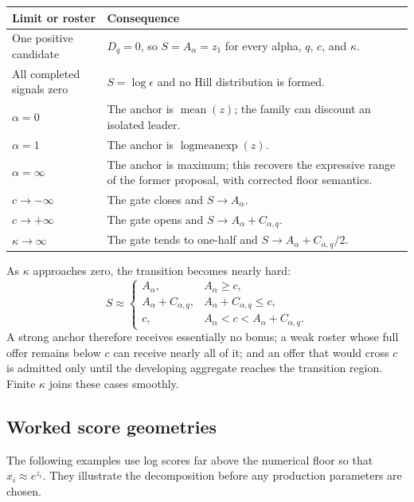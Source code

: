 \documentclass[11pt]{article}
\begin{document}
\begin{center}
\small
\begin{tabularx}{0.96\textwidth}{@{}p{}>{\raggedright\arraybackslash}X@{}}
\toprule
Limit or roster & Consequence \\
\midrule
One positive candidate & $D_q=0$, so $S=A_\alpha=z_1$ for every alpha,
$q$, $c$, and $\kappa$. \\
All completed signals zero & $S=\log\epsilon$ and no Hill distribution is
formed. \\
$\alpha=0$ & The anchor is $\operatorname{mean}(z)$; the family can discount
an isolated leader. \\
$\alpha=1$ & The anchor is $\operatorname{logmeanexp}(z)$. \\
$\alpha=\infty$ & The anchor is maximum; this recovers the expressive range
of the former proposal, with corrected floor semantics. \\
$c\rightarrow-\infty$ & The gate closes and $S\rightarrow A_\alpha$. \\
$c\rightarrow+\infty$ & The gate opens and
$S\rightarrow A_\alpha+C_{\alpha,q}$. \\
$\kappa\rightarrow\infty$ & The gate tends to one-half and
$S\rightarrow A_\alpha+C_{\alpha,q}/2$. \\
\bottomrule
\end{tabularx}
\end{center}

As $\kappa$ approaches zero, the transition becomes nearly hard:
\begin{equation}
S
\approx
\begin{cases}
A_\alpha, & A_\alpha\geq c,\\
A_\alpha+C_{\alpha,q}, & A_\alpha+C_{\alpha,q}\leq c,\\
c, & A_\alpha<c<A_\alpha+C_{\alpha,q}.
\end{cases}
\label{eq:hard-gate}
\end{equation}
A strong anchor therefore receives essentially no bonus; a weak roster whose
full offer remains below $c$ can receive nearly all of it; and an offer that
would cross $c$ is admitted only until the developing aggregate reaches the
transition region. Finite $\kappa$ joins these cases smoothly.

\subsection{Worked score geometries}

The following examples use log scores far above the numerical floor so that
$x_i\approx e^{z_i}$. They illustrate the decomposition before any production
parameters are chosen.
\end{document}
